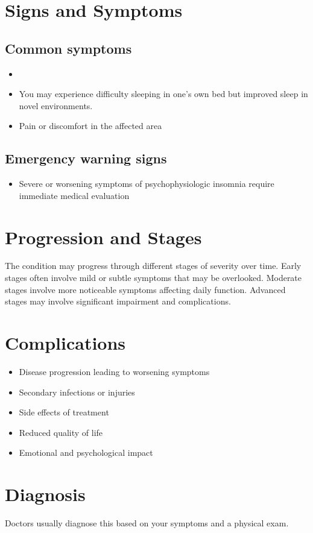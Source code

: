 \section{Signs and Symptoms}
\subsection{Common symptoms}
\begin{itemize}[noitemsep]
  \item \item You may experience difficulty sleeping in one's own bed but improved sleep in novel environments.
  \item Pain or discomfort in the affected area
  \end{itemize}
\subsection{Emergency warning signs}
\begin{itemize}[noitemsep]
  \item Severe or worsening symptoms of psychophysiologic insomnia require immediate medical evaluation
\end{itemize}
\section{Progression and Stages}
The condition may progress through different stages of severity over time. Early stages often involve mild or subtle symptoms that may be overlooked. Moderate stages involve more noticeable symptoms affecting daily function. Advanced stages may involve significant impairment and complications.
\section{Complications}
\begin{itemize}[noitemsep]
  \item Disease progression leading to worsening symptoms
  \item Secondary infections or injuries
  \item Side effects of treatment
  \item Reduced quality of life
  \item Emotional and psychological impact
\end{itemize}
\section{Diagnosis}
Doctors usually diagnose this based on your symptoms and a physical exam.

